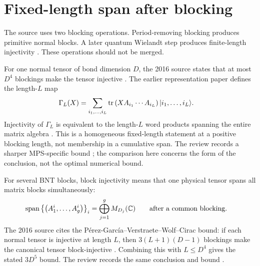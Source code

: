 \documentclass{article}
\begin{document}
\section{Fixed-length span after blocking}

The source uses two blocking operations. Period-removing blocking produces
primitive normal blocks. A later quantum Wielandt step produces finite-length
injectivity \cite{Sanz2010Quantum}. These operations should not be merged.

For one normal tensor of bond dimension $D$, the 2016 source states that at
most $D^4$ blockings make the tensor injective
\cite[line~332]{Cirac2016MPDO_arXiv}. The earlier representation paper defines
the length-$L$ map
\begin{align}
    \Gamma_L(X)
        &=
        \sum_{i_1,\ldots,i_L}
        \operatorname{tr}\left(XA_{i_1}\cdots A_{i_L}\right)
        |i_1,\ldots,i_L\rangle.
    \label{eq:rmp_nonperiodic_bnt_comparison_inputs_gamma_length_map}
\end{align}
Injectivity of $\Gamma_L$ is equivalent to the length-$L$ word products
spanning the entire matrix algebra
\cite[lines~888--908]{PerezGarcia2007MPSReps}. This is a homogeneous
fixed-length statement at a positive blocking length, not membership in a
cumulative span. The review records a sharper MPS-specific bound
\cite[lines~1942--1945]{Cirac2021Matrix}; the comparison here concerns the form
of the conclusion, not the optimal numerical bound.

For several BNT blocks, block injectivity means that one physical tensor spans
all matrix blocks simultaneously:
\begin{align}
    \operatorname{span}
        \left\{\left(A_1^i,\ldots,A_g^i\right)\right\}_i
        &=
        \bigoplus_{j=1}^{g}M_{D_j}(\mathbb{C})
        \qquad\text{after a common blocking}.
    \label{eq:rmp_nonperiodic_bnt_comparison_inputs_common_block_span}
\end{align}
The 2016 source cites the P\'erez-Garc\'ia--Verstraete--Wolf--Cirac bound: if
each normal tensor is injective at length $L$, then
$3(L+1)(D-1)$ blockings make the canonical tensor block-injective
\cite[lines~317--345]{Cirac2016MPDO_arXiv,PerezGarcia2007MPSReps}. Combining
this with $L\leq D^4$ gives the stated $3D^5$ bound. The review records the
same conclusion and bound \cite[lines~2114--2124]{Cirac2021Matrix}.
\end{document}
